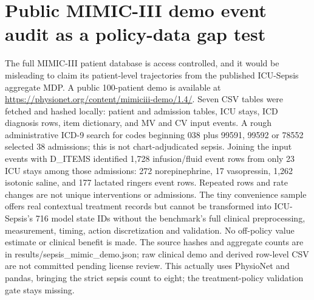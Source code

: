\section{Public MIMIC-III demo event audit as a policy-data gap test}
The full MIMIC-III patient database is access controlled, and it would be misleading to claim its patient-level trajectories from the published ICU-Sepsis aggregate MDP. A public 100-patient demo is available at \url{https://physionet.org/content/mimiciii-demo/1.4/}. Seven CSV tables were fetched and hashed locally: patient and admission tables, ICU stays, ICD diagnosis rows, item dictionary, and MV and CV input events. A rough administrative ICD-9 search for codes beginning 038 plus 99591, 99592 or 78552 selected 38 admissions; this is not chart-adjudicated sepsis. Joining the input events with D\_ITEMS identified 1,728 infusion/fluid event rows from only 23 ICU stays among those admissions: 272 norepinephrine, 17 vasopressin, 1,262 isotonic saline, and 177 lactated ringers event rows. Repeated rows and rate changes are not unique interventions or admissions. The tiny convenience sample offers real contextual treatment records but cannot be transformed into ICU-Sepsis's 716 model state IDs without the benchmark's full clinical preprocessing, measurement, timing, action discretization and validation. No off-policy value estimate or clinical benefit is made. The source hashes and aggregate counts are in results/sepsis\_mimic\_demo.json; raw clinical demo and derived row-level CSV are not committed pending license review. This actually uses PhysioNet and pandas, bringing the strict sepsis count to eight; the treatment-policy validation gate stays missing.


